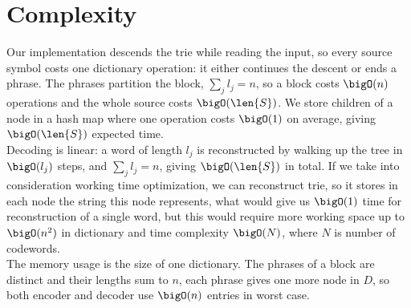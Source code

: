 \section{Complexity}

Our implementation descends the trie while reading the input, so every source symbol costs one dictionary operation: it either continues the descent or ends a phrase. The phrases partition the block, \(\sum_j l_j = n\), so a block costs \(\bigO(n)\) operations and the whole source costs \(\bigO(\len{S})\). We store children of a node in a hash map where one operation costs \(\bigO(1)\) on average, giving \(\bigO(\len{S})\) expected time. 
\\

Decoding is linear: a word of length \(l_j\) is reconstructed by walking up the tree in \(\bigO(l_j)\) steps, and \(\sum_j l_j = n\), giving \(\bigO(\len{S})\) in total. If we take into consideration working time optimization, we can reconstruct trie, so it stores in each node the string this node represents, what would give us \(\bigO(1)\) time for reconstruction of a single word, but this would require more working space up to \(\bigO(n^2)\) in dictionary and time complexity \(\bigO(N)\), where \(N\) is number of codewords.
\\

The memory usage is the size of one dictionary. The phrases of a block are distinct and their lengths sum to \(n\), each phrase gives one more node in \(D\), so both encoder and decoder use \(\bigO(n)\) entries in worst case.
